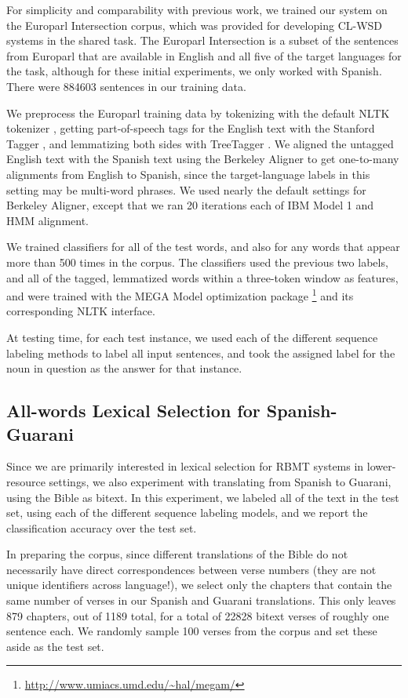 \documentclass[11pt]{article}
\begin{document}
For simplicity and comparability with previous work, we trained our system on
the Europarl Intersection corpus, which was provided for developing CL-WSD
systems in the shared task.  The Europarl Intersection is a subset of the
sentences from Europarl \cite{europarl} that are available in English and all
five of the target languages for the task, although for these initial
experiments, we only worked with Spanish. There were 884603 sentences in our
training data.

We preprocess the Europarl training data by tokenizing with the default NLTK
tokenizer \cite{nltkbook}, getting part-of-speech tags for the English text
with the Stanford Tagger \cite{Toutanova03feature-richpart-of-speech}, and
lemmatizing both sides with TreeTagger \cite{Schmid95improvementsin}.  We
aligned the untagged English text with the Spanish text using the Berkeley
Aligner \cite{denero-klein:2007:ACLMain} to get one-to-many alignments from
English to Spanish, since the target-language labels in this setting may be
multi-word phrases. We used nearly the default settings for Berkeley Aligner,
except that we ran 20 iterations each of IBM Model 1 and HMM alignment.

We trained classifiers for all of the test words, and also for any words that
appear more than 500 times in the corpus. The classifiers used the previous two
labels, and all of the tagged, lemmatized words within a three-token window as
features, and were trained with the MEGA Model optimization package
\footnote{\url{http://www.umiacs.umd.edu/~hal/megam/}} and its corresponding
NLTK interface.

At testing time, for each test instance, we used each of the different sequence
labeling methods to label all input sentences, and took the assigned label for
the noun in question as the answer for that instance.

\subsection{All-words Lexical Selection for Spanish-Guarani}
Since we are primarily interested in lexical selection for RBMT systems in
lower-resource settings, we also experiment with translating from Spanish to
Guarani, using the Bible as bitext. In this experiment, we labeled all of the
text in the test set, using each of the different sequence labeling models, and
we report the classification accuracy over the test set.

In preparing the corpus, since different translations of the Bible do not
necessarily have direct correspondences between verse numbers (they are not
unique identifiers across language!), we select only the chapters that contain
the same number of verses in our Spanish and Guarani translations.  This only
leaves 879 chapters, out of 1189 total, for a total of 22828 bitext verses of
roughly one sentence each. We randomly sample 100 verses from the corpus and
set these aside as the test set.
\end{document}
